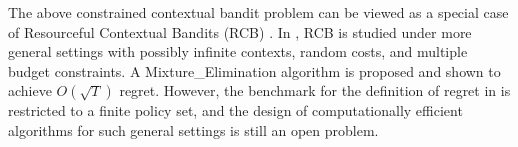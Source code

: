 


The above constrained contextual bandit problem can be viewed as a special case of Resourceful Contextual Bandits (RCB)
\cite{Badanidiyuru2014COLT}. In \cite{Badanidiyuru2014COLT}, RCB is studied under more general settings with possibly infinite contexts, random costs, and multiple budget constraints.
A Mixture\_Elimination algorithm is proposed and shown to achieve  $O(\sqrt{T})$ regret.
However, the benchmark for the definition of regret in \cite{Badanidiyuru2014COLT} is restricted to a finite policy set, and the design of computationally efficient algorithms for such general settings is still
an open problem.

